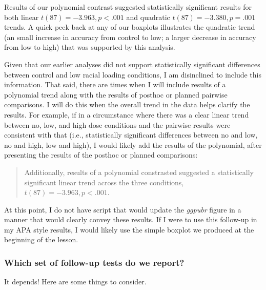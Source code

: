 \documentclass[
  11pt,
]{book}
\begin{document}
Results of our polynomial contrast suggested statistically significant results for both linear \(t(87) = -3.963 , p < .001\) and quadratic \(t(87) = -3.380, p = .001\) trends. A quick peek back at any of our boxplots illustrates the quadratic trend (an small increase in accuracy from control to low; a larger decrease in accuracy from low to high) that was supported by this analysis.

Given that our earlier analyses did not support statistically significant differences between control and low racial loading conditions, I am disinclined to include this information. That said, there are times when I will include results of a polynomial trend along with the results of posthoc or planned pairwise comparisons. I will do this when the overall trend in the data helps clarify the results. For example, if in a circumstance where there was a clear linear trend between no, low, and high dose conditions and the pairwise results were consistent with that (i.e., statistically significant differences between no and low, no and high, low and high), I would likely add the results of the polynomial, after presenting the results of the posthoc or planned comparisons:

\begin{quote}
Additionally, results of a polynomial constrasted suggested a statistically significant linear trend across the three conditions, \(t(87) = -3.963 , p < .001\).
\end{quote}

At this point, I do not have script that would update the \emph{ggpubr} figure in a manner that would clearly convey these results. If I were to use this follow-up in my APA style results, I would likely use the simple boxplot we produced at the beginning of the lesson.

\hypertarget{which-set-of-follow-up-tests-do-we-report}{%
\subsubsection{Which set of follow-up tests do we report?}\label{which-set-of-follow-up-tests-do-we-report}}

It depends! Here are some things to consider.
\end{document}
